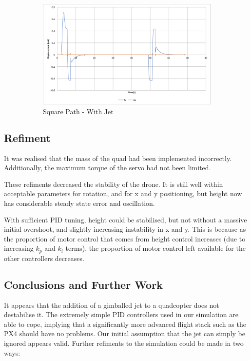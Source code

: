 \documentclass[10pt]{article}
\begin{document}
\begin{figure}[p]
    \begin{subfigure}{0.72\textwidth}
        \includegraphics[width=\textwidth]{square_path_w_jet_angle}
        \caption{Square Path - With Jet}
        \label{fig:square_path_w_jet_angle}
    \end{subfigure}
    \caption{}
\end{figure}

\subsection{Refiment}
It was realised that the mass of the quad had been implemented incorrectly. Additionally, the maximum torque of the servo had not been limited.

These refiments decreased the stability of the drone. It is still well within acceptable parameters for rotation, and for x and y positioning, but height now has considerable steady state error and oscillation.

With sufficient PID tuning, height could be stabilised, but not without a massive initial overshoot, and slightly increasing instability in x and y. This is because as the proportion of motor control that comes from height control increases (due to increasing $k_p$ and $k_i$ terms), the proportion of motor control left available for the other controllers decreases.

\subsection{Conclusions and Further Work}
It appears that the addition of a gimballed jet to a quadcopter does not destabilise it. The extremely simple PID controllers used in our simulation are able to cope, implying that a significantly more advanced flight stack such as the PX4 should have no problems. Our initial assumption that the jet can simply be ignored appears valid. Further refiments to the simulation could be made in two ways:
\end{document}
